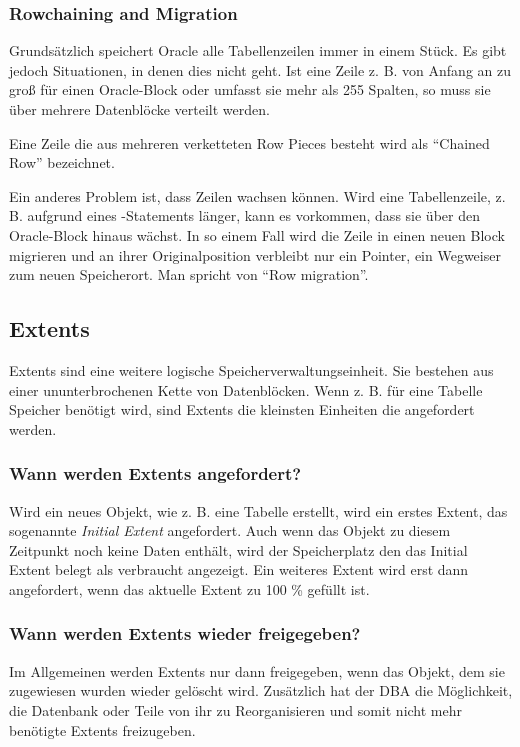         \subsubsection{Rowchaining and Migration}
          Grundsätzlich speichert Oracle alle Tabellenzeilen immer in einem Stück. Es gibt jedoch Situationen, in denen dies nicht geht. Ist eine Zeile z. B. von Anfang an zu groß für einen Oracle-Block oder umfasst sie mehr als 255 Spalten, so muss sie über mehrere Datenblöcke verteilt werden.
          \begin{merke}
            Eine Zeile die aus mehreren verketteten Row Pieces besteht wird als \enquote{Chained Row} bezeichnet.
          \end{merke}
          Ein anderes Problem ist, dass Zeilen wachsen können. Wird eine Tabellenzeile, z. B. aufgrund eines -Statements länger, kann es vorkommen, dass sie über den Oracle-Block hinaus wächst. In so einem Fall wird die Zeile in einen neuen Block migrieren und an ihrer Originalposition verbleibt nur ein Pointer, ein Wegweiser zum neuen Speicherort. Man spricht von \enquote{Row migration}.
      \subsection{Extents}
        Extents sind eine weitere logische Speicherverwaltungseinheit. Sie bestehen aus einer ununterbrochenen Kette von Datenblöcken. Wenn z. B. für  eine Tabelle Speicher benötigt wird, sind Extents die kleinsten Einheiten die angefordert werden.
        \subsubsection{Wann werden Extents angefordert?}
          Wird ein neues Objekt, wie z. B. eine Tabelle erstellt, wird ein erstes Extent, das sogenannte \textit{Initial Extent} angefordert. Auch wenn das Objekt zu diesem Zeitpunkt noch keine Daten enthält, wird der Speicherplatz den das Initial Extent belegt als verbraucht angezeigt. Ein weiteres Extent wird erst dann angefordert, wenn das aktuelle Extent zu 100 \% gefüllt ist.
        \subsubsection{Wann werden Extents wieder freigegeben?}
          Im Allgemeinen werden Extents nur dann freigegeben, wenn das Objekt, dem sie zugewiesen wurden wieder gelöscht wird. Zusätzlich hat der DBA die Möglichkeit, die Datenbank oder Teile von ihr zu Reorganisieren und somit nicht mehr benötigte Extents freizugeben.
